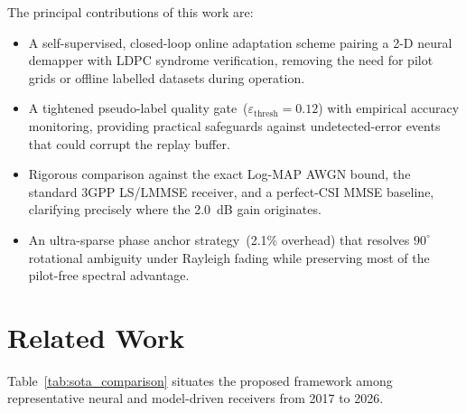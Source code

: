\documentclass{ieeeaccess}
\begin{document}
The principal contributions of this work are:
\begin{itemize}
  \item A self-supervised, closed-loop online adaptation scheme pairing a 2-D neural
    demapper with LDPC syndrome verification, removing the need for pilot grids or
    offline labelled datasets during operation.
  \item A tightened pseudo-label quality gate~($\varepsilon_{\text{thresh}}=0.12$)
    with empirical accuracy monitoring, providing practical safeguards against
    undetected-error events that could corrupt the replay buffer.
  \item Rigorous comparison against the exact Log-MAP AWGN bound, the standard 3GPP
    LS/LMMSE receiver, and a perfect-CSI MMSE baseline, clarifying precisely where
    the 2.0~dB gain originates.
  \item An ultra-sparse phase anchor strategy~(2.1\% overhead) that resolves
    $90^{\circ}$ rotational ambiguity under Rayleigh fading while preserving most
    of the pilot-free spectral advantage.
\end{itemize}

\section{Related Work}\label{sec:related}

Table~\ref{tab:sota_comparison} situates the proposed framework among representative
neural and model-driven receivers from 2017 to 2026.
\end{document}
